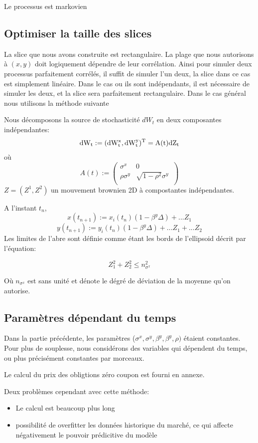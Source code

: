 Le processus est markovien

\subsection{Optimiser la taille des slices }

La slice que nous avons construite est rectangulaire.
La plage que nous autorisons à $(x, y)$ doit logiquement dépendre de leur corrélation. Ainsi pour simuler deux processus parfaitement corrélés, il suffit de simuler l'un deux, la slice dans ce cas est simplement linéaire. Dans le cas ou ils sont indépendants, il est nécessaire de simuler les deux, et la slice sera parfaitement rectangulaire. Dans le cas général nous utilisons la méthode suivante 

Nous décomposons la source de stochasticité $dW_t$ en deux composantes indépendantes:
$$ \rm{d} W_t := (\rm{d} W^x_t, \rm{d} W^y_t)^T = A(t)  \rm{d}Z_t$$
où
$$
A(t) := 
\left(
  \begin{array}{cc}
            \sigma^x & 0  \\
            \rho \sigma^y & \sqrt{1-\rho^2} \sigma^y \  \\
  \end{array}
\right)
$$
$Z = (Z^1, Z^2)$ un mouvement brownien 2D à compostantes indépendantes.

A l'instant $t_n$,
$$x(t_{n+1}) := x_i(t_n) (1 - \beta^y \Delta) + ... Z_1$$
$$y(t_{n+1}) := y_i(t_n) (1 - \beta^y \Delta) + ... Z_1 + ...Z_2$$
Les limites de l'abre sont définie comme étant les bords de l'ellipsoid décrit par l'équation:

$$Z_1^2 + Z_2^2 \leq n_{\sigma^x}^2$$

Où $n_{\sigma^x}$ est sans unité et dénote le dégré de déviation de la moyenne qu'on autorise.


\subsection{ Paramètres dépendant du temps}

Dans la partie précédente, les paramètres ($\sigma^x, \sigma^y, \beta^y, \beta^y, \rho)$ étaient constantes. Pour plus de souplesse, nous considérons des variables qui dépendent  du temps, ou plus précisément constantes par morceaux.

Le calcul du prix des obligtions zéro coupon est fourni en annexe.

Deux problèmes cependant avec cette méthode:

\begin{itemize}
\item Le calcul est beaucoup plus long
\item possibilité de overfitter les données historique du marché, ce qui affecte négativement le pouvoir prédicitive du modèle
\end{itemize}


